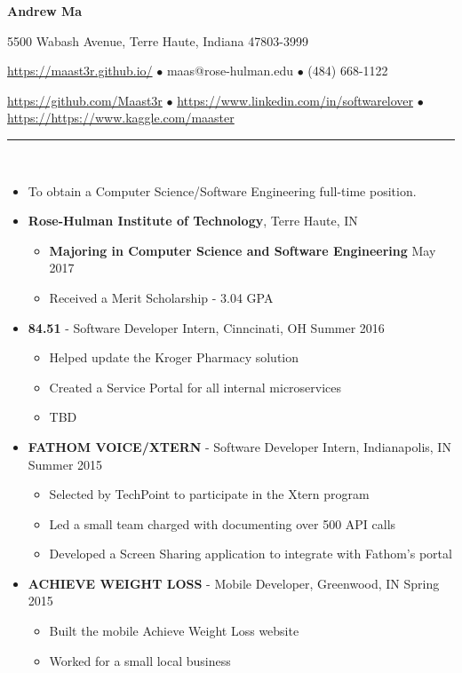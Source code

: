 \documentclass[10pt]{article} %
\begin{document}
\centerline{\LARGE \textbf{Andrew Ma}}  %
\noindent %
\centerline {5500 Wabash Avenue, Terre Haute, Indiana 47803-3999}
\centerline{ \url{https://maast3r.github.io/} $\bullet$ maas@rose-hulman.edu $\bullet$ (484) 668-1122}
\centerline{\url{https://github.com/Maast3r} $\bullet$ \url{https://www.linkedin.com/in/softwarelover} $\bullet$ \url{https://https://www.kaggle.com/maaster}}

\noindent\rule{16.5cm}{0.4pt} %
\\  %
\begin{itemize}
	\item[] To obtain a Computer Science/Software Engineering full-time position.
\end{itemize}
\normalsize \begin{itemize}
	\item[] \normalsize \textbf{Rose-Hulman Institute of Technology}, Terre Haute, IN
	\begin{itemize}
		\item \normalsize \textbf{Majoring in Computer Science and Software Engineering} \hfill May 2017
		\item \normalsize Received a Merit Scholarship - 3.04 GPA
	\end{itemize}
\end{itemize}
\begin{itemize}
	\item[] \textbf{ 84.51\degree} - Software Developer Intern, Cinncinati, OH \hfill{Summer 2016}
	\begin{itemize}
		\item Helped update the Kroger Pharmacy solution
		\item Created a Service Portal for all internal microservices
		\item TBD
	\end{itemize}
	\item[] \textbf{\small FATHOM VOICE/XTERN} - Software Developer Intern, Indianapolis, IN \hfill{Summer 2015}
	\begin{itemize}
		\item Selected by TechPoint to participate in the Xtern program
		\item Led a small team charged with documenting over 500 API calls
		\item Developed a Screen Sharing application to integrate with Fathom's portal
	\end{itemize}
	\item[] \textbf{\small ACHIEVE WEIGHT LOSS} - Mobile Developer, Greenwood, IN \hfill{Spring 2015}
	\begin{itemize}
		\item Built the mobile Achieve Weight Loss website
		\item Worked for a small local business 
	\end{itemize}
\end{itemize}
\end{document}
